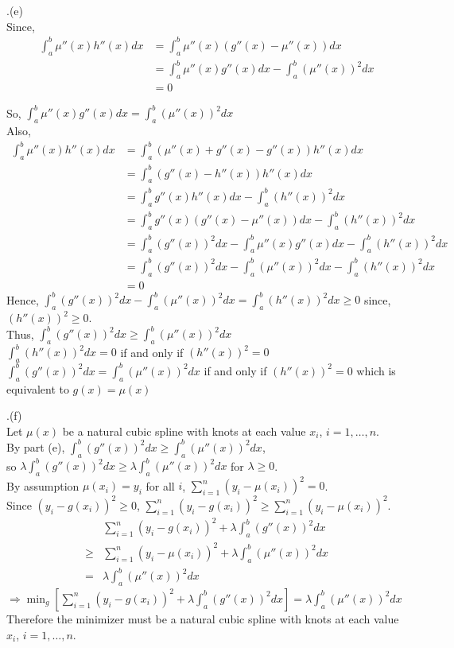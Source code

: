 \documentclass[12pt]{article}
\DeclareMathOperator*{\mini}{min}
\begin{document}
\newpage
{}.(e)\\
Since, 
\begin{align*}
    \int_a^b \mu''(x) h''(x) dx & = \int_a^b \mu''(x) (g''(x) - \mu''(x)) dx \\
    & = \int_a^b \mu''(x) g''(x) dx - \int_a^b (\mu''(x))^2 dx \\
    & = 0
\end{align*}

So, $\int_a^b \mu''(x) g''(x) dx = \int_a^b (\mu''(x))^2 dx$\\
Also,
\begin{align*}
    \int_a^b \mu''(x) h''(x) dx & = \int_a^b (\mu''(x) + g''(x) - g''(x)) h''(x) dx\\
    & = \int_a^b (g''(x) - h''(x)) h''(x) dx\\
    & = \int_a^b g''(x) h''(x) dx - \int_a^b (h''(x))^2 dx\\
    & = \int_a^b g''(x) (g''(x) - \mu''(x)) dx - \int_a^b (h''(x))^2 dx\\
    & = \int_a^b (g''(x))^2 dx - \int_a^b \mu''(x) g''(x) dx - \int_a^b (h''(x))^2 dx\\
    & = \int_a^b (g''(x))^2 dx - \int_a^b (\mu''(x))^2 dx - \int_a^b (h''(x))^2 dx\\
    & = 0
\end{align*}
Hence, $\int_a^b (g''(x))^2 dx - \int_a^b (\mu''(x))^2 dx = \int_a^b (h''(x))^2 dx \geq 0$ since, 
$(h''(x))^2 \geq 0$.\\
Thus, $\int_a^b (g''(x))^2 dx \geq \int_a^b (\mu''(x))^2 dx$\\
$\int_a^b (h''(x))^2 dx = 0$ if and only if $(h''(x))^2 = 0$\\
$\int_a^b (g''(x))^2 dx = \int_a^b (\mu''(x))^2 dx$ if and only if $(h''(x))^2 = 0$ which is equivalent to 
$g(x) = \mu(x)$

\newpage
{}.(f)\\
Let $\mu(x)$ be a natural cubic spline with knots at each value $x_i$, $i = 1, \dots, n$.\\
By part (e), $\int_a^b (g''(x))^2 dx \geq \int_a^b (\mu''(x))^2 dx$, \\
so $\lambda \int_a^b (g''(x))^2 dx \geq \lambda \int_a^b (\mu''(x))^2 dx$ for $\lambda \geq 0$.\\
By assumption $\mu(x_i) = y_i$ for all $i$, $\sum_{i = 1}^{n} (y_i - \mu(x_i))^2 = 0$. \\
Since $(y_i - g(x_i))^2 \geq 0$, $\sum_{i = 1}^{n} (y_i - g(x_i))^2 \geq \sum_{i = 1}^{n} (y_i - \mu(x_i))^2$.
\begin{align*}
    & \sum_{i = 1}^{n} (y_i - g(x_i))^2 + \lambda \int_a^b (g''(x))^2 dx \\
    \geq &\sum_{i = 1}^{n} (y_i - \mu(x_i))^2 + \lambda \int_a^b (\mu''(x))^2 dx \\
    = & \lambda \int_a^b (\mu''(x))^2 dx
\end{align*}
$\Longrightarrow \mini_g [\sum_{i = 1}^{n} (y_i - g(x_i))^2 + \lambda \int_a^b (g''(x))^2 dx] = 
\lambda \int_a^b (\mu''(x))^2 dx$\\
Therefore the minimizer must be a natural cubic spline with knots at each value $x_i$, $i = 1, \dots, n$.
\end{document}
